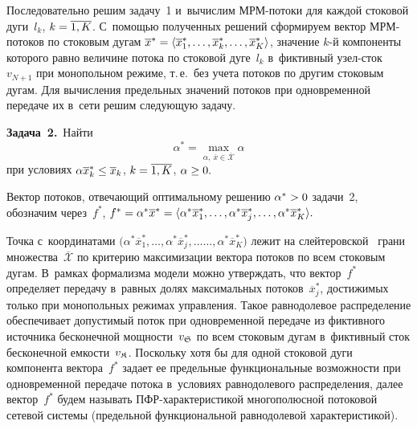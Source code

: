 \begin{multicols}{2}
Последовательно решим задачу~1 и~вычислим МРМ-потоки  для каждой стоковой дуги~$l_k$,  
$k \hm = \overline{1, K}$.
С~по\-мощью полученных решений сформируем вектор МРМ-по\-то\-ков по стоковым дугам
${\overline{{x}}^*} \hm= \langle \overline {x}_{1}^*,\ldots, \overline {x}_{k}^*, 
\ldots, \overline {x}_{K}^* \rangle$,
значение  $k$-й компоненты которого равно величине потока по стоковой дуге~$l_k$ 
в~фиктивный узел-сток~$v_{N+1}$ при монопольном режиме, т.\,е.\
 без учета потоков по другим стоковым дугам. Для вычисления предельных 
 значений потоков при одновременной передаче их в~сети решим сле\-ду\-ющую задачу.
 
 \smallskip
 
 \noindent
 \textbf{Задача~2.}\ Найти
$$
\alpha^{*} = \max_{\alpha, \  \overline{{x}} \in \overline{\mathcal{X} }}\alpha
$$
при условиях 
$ \alpha \overline {x}_k^{*} \hm\le  \overline {x}_k$, 
$k \hm= \overline {1, K}$, $\alpha \hm\geq 0.$ 

Вектор потоков, отвечающий оптимальному решению  $\alpha^{*}\hm>0$ задачи~2, обозначим 
через~${f}^*$,
${f}^* \hm= \alpha^* \overline {x}^* \hm=  \langle \alpha^*\overline {x}_{1}^*,\ldots, 
\alpha^*\overline {x}_{j}^*,\ldots, \alpha^*\overline {x}_{K}^* \rangle.$

Точка с~координатами $(\alpha^*\overline {x}_{1}^*,\ldots, 
\alpha^*\overline {x}_{j}^*,\ldots$\linebreak $\ldots,  
\alpha^*\overline {x}_{K}^*)$ лежит на слейтеровской~\cite{germ, Pod} грани 
множества~$\overline{\mathcal{X}}$ по критерию максимизации вектора потоков 
по всем стоковым дугам.
В~рамках формализма модели можно утверждать, что вектор~${f}^*$ 
определяет передачу в~равных долях максимальных потоков~$\overline{x}_{j}^*$, 
достижимых только при монопольных режимах управления.  Такое равнодолевое 
распределение обеспечивает допустимый поток при одновременной передаче 
из фиктивного источника бесконечной мощности~$v_{{\frak S}}$ по всем стоковым дугам 
в~фиктивный сток бесконечной емкости~$v_{{\frak K}}$.
Поскольку хотя бы для одной стоковой дуги компонента вектора~${f}^*$ 
задает ее предельные функциональные возможности при одновременной пе\-редаче 
потока в~условиях равнодолевого распределения, далее вектор~${f}^*$ 
будем называть ПФР-ха\-рак\-те\-ри\-сти\-кой многополюсной потоковой сетевой\linebreak 
сис\-те\-мы (предельной функциональной равнодолевой характеристикой). 

\vspace*{-4pt}


\end{multicols}
